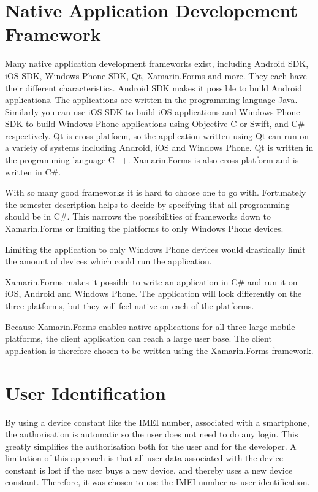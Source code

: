 \section{Native Application Developement Framework}
\label{par:native_application_development_framework}

Many native application development frameworks exist, including Android SDK, iOS SDK, Windows Phone SDK, Qt, Xamarin.Forms and more. They each have their different characteristics. Android SDK makes it possible to build Android applications. The applications are written in the programming language Java. Similarly you can use iOS SDK to build iOS applications and Windows Phone SDK to build Windows Phone applications using Objective C or Swift, and C\# respectively. Qt is cross platform, so the application written using Qt can run on a variety of systems including Android, iOS and Windows Phone. Qt is written in the programming language C++. Xamarin.Forms is also cross platform and is written in C\#.

With so many good frameworks it is hard to choose one to go with. Fortunately the semester description helps to decide by specifying that all programming should be in C\#. This narrows the possibilities of frameworks down to Xamarin.Forms or limiting the platforms to only Windows Phone devices.

Limiting the application to only Windows Phone devices would drastically limit the amount of devices which could run the application.

Xamarin.Forms makes it possible to write an application in C\# and run it on iOS, Android and Windows Phone. The application will look differently on the three platforms, but they will feel native on each of the platforms.

Because Xamarin.Forms enables native applications for all three large mobile platforms, the client application can reach a large user base. The client application is therefore chosen to be written using the Xamarin.Forms framework.

\section{User Identification}
\label{uid}
By using a device constant like the IMEI number, associated with a smartphone, the authorisation is automatic so the user does not need to do any login. This greatly simplifies the authorisation both for the user and for the developer. A limitation of this approach is that all user data associated with the device constant is lost if the user buys a new device, and thereby uses a new device constant. Therefore, it was chosen to use the IMEI number as user identification. %

